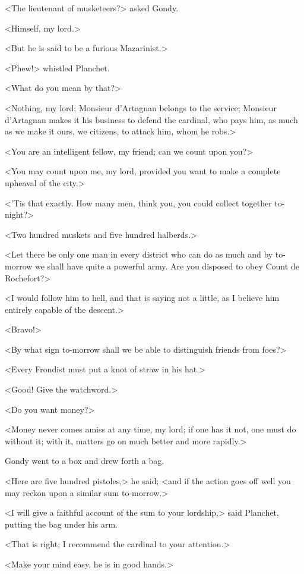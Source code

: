 <The lieutenant of musketeers?> asked Gondy.

<Himself, my lord.>

<But he is said to be a furious Mazarinist.>

<Phew!> whistled Planchet.

<What do you mean by that?>

<Nothing, my lord; Monsieur d'Artagnan belongs to the service; Monsieur d'Artagnan makes it his business to defend the cardinal, who pays him, as much as we make it ours, we citizens, to attack him, whom he robs.>

<You are an intelligent fellow, my friend; can we count upon you?>

<You may count upon me, my lord, provided you want to make a complete upheaval of the city.>

<'Tis that exactly. How many men, think you, you could collect together to-night?>

<Two hundred muskets and five hundred halberds.>

<Let there be only one man in every district who can do as much and by to-morrow we shall have quite a powerful army. Are you disposed to obey Count de Rochefort?>

<I would follow him to hell, and that is saying not a little, as I believe him entirely capable of the descent.>

<Bravo!>

<By what sign to-morrow shall we be able to distinguish friends from foes?>

<Every Frondist must put a knot of straw in his hat.>

<Good! Give the watchword.>

<Do you want money?>

<Money never comes amiss at any time, my lord; if one has it not, one must do without it; with it, matters go on much better and more rapidly.>

Gondy went to a box and drew forth a bag.

<Here are five hundred pistoles,> he said; <and if the action goes off well you may reckon upon a similar sum to-morrow.>

<I will give a faithful account of the sum to your lordship,> said Planchet, putting the bag under his arm.

<That is right; I recommend the cardinal to your attention.>

<Make your mind easy, he is in good hands.>

